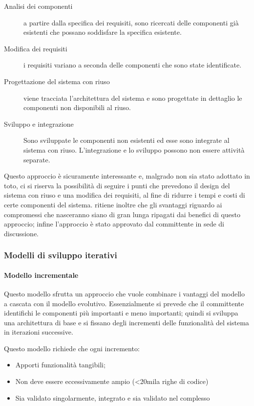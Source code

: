 \begin{description}
\item [Analisi dei componenti] a partire dalla specifica dei requisiti, sono ricercati delle componenti già esistenti che possano soddisfare la specifica esistente.
\item [Modifica dei requisiti] i requisiti variano a seconda delle componenti che sono state identificate.
\item [Progettazione del sistema con riuso] viene tracciata l'architettura del sistema e sono progettate in dettaglio le componenti non disponibili al riuso.
\item [Sviluppo e integrazione] Sono sviluppate le componenti non esistenti ed esse sono integrate al sistema con riuso. L'integrazione e lo sviluppo possono non essere attività separate.

\end{description}
Questo approccio è sicuramente interessante e, malgrado non sia stato adottato in toto, ci si riserva la possibilità di seguire i punti che prevedono il design del sistema con riuso e una modifica dei requisiti, al fine di ridurre i tempi e costi di certe componenti del sistema. \hx{} ritiene inoltre che gli svantaggi riguardo ai compromessi che nasceranno siano di gran lunga ripagati dai benefici di questo approccio; infine l'approccio è stato approvato dal committente in sede di discussione.

		\subsubsection{Modelli di sviluppo iterativi}
			\paragraph{Modello incrementale}
			Questo modello sfrutta un approccio che vuole combinare i vantaggi del modello a cascata con il modello evolutivo. Essenzialmente si prevede che il committente identifichi le componenti più importanti e meno importanti; quindi si sviluppa una architettura di base e si fissano degli incrementi delle funzionalità del sistema in iterazioni successive.

Questo modello richiede che ogni incremento:
\begin{itemize}
\item Apporti funzionalità tangibili;
\item Non deve essere eccessivamente ampio (<20mila righe di codice)
\item Sia validato singolarmente, integrato e sia validato nel complesso
\end{itemize}

